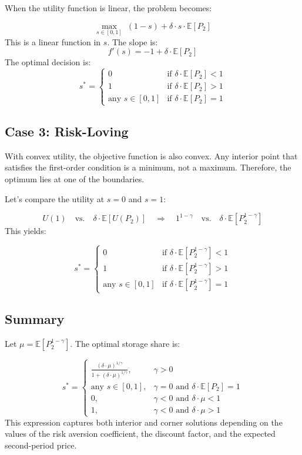 \documentclass[12pt]{article}
\begin{document}
When the utility function is linear, the problem becomes:

\[
\max_{s \in [0,1]} \; (1 - s) + \delta \cdot s \cdot \mathbb{E}[P_2]
\]
This is a linear function in \( s \). The slope is:
\[
f'(s) = -1 + \delta \cdot \mathbb{E}[P_2]
\]
The optimal decision is:
\[
s^* =
\begin{cases}
0 & \text{if } \delta \cdot \mathbb{E}[P_2] < 1 \\
1 & \text{if } \delta \cdot \mathbb{E}[P_2] > 1 \\
\text{any } s \in [0,1] & \text{if } \delta \cdot \mathbb{E}[P_2] = 1
\end{cases}
\]

\subsection{Case 3: Risk-Loving}

With convex utility, the objective function is also convex. Any interior point that satisfies the first-order condition is a minimum, not a maximum. Therefore, the optimum lies at one of the boundaries.

Let's compare the utility at \( s = 0 \) and \( s = 1 \):

\[
U(1) \quad \text{vs.} \quad \delta \cdot \mathbb{E}[U(P_2)]
\quad \Rightarrow \quad
1^{1 - \gamma} \quad \text{vs.} \quad \delta \cdot \mathbb{E}[P_2^{1 - \gamma}]
\]
This yields:

\[
s^* =
\begin{cases}
0 & \text{if } \delta \cdot \mathbb{E}[P_2^{1 - \gamma}] < 1 \\
1 & \text{if } \delta \cdot \mathbb{E}[P_2^{1 - \gamma}] > 1 \\
\text{any } s \in [0,1] & \text{if } \delta \cdot \mathbb{E}[P_2^{1 - \gamma}] = 1
\end{cases}
\]

\subsection{Summary}

Let \( \mu = \mathbb{E}[P_2^{1 - \gamma}] \). The optimal storage share is:

\[
s^* =
\begin{cases}
\displaystyle \frac{(\delta \cdot \mu)^{1/\gamma}}{1 + (\delta \cdot \mu)^{1/\gamma}}, & \gamma > 0 \\
\text{any } s \in [0,1], & \gamma = 0 \text{ and } \delta \cdot \mathbb{E}[P_2] = 1 \\
0, & \gamma < 0 \text{ and } \delta \cdot \mu < 1 \\
1, & \gamma < 0 \text{ and } \delta \cdot \mu > 1
\end{cases}
\]
This expression captures both interior and corner solutions depending on the values of the risk aversion coefficient, the discount factor, and the expected second-period price.
\end{document}
